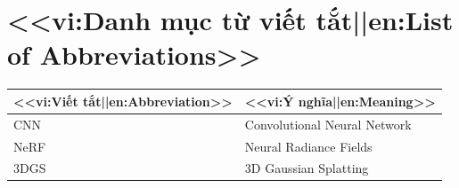 \chapter*{<<vi:Danh mục từ viết tắt||en:List of Abbreviations>>}
\begin{center}
\begin{tabular}{@{}p{3cm}p{10cm}@{}}
  \hline
  \textbf{<<vi:Viết tắt||en:Abbreviation>>} & \textbf{<<vi:Ý nghĩa||en:Meaning>>} \\ \hline
  CNN  & Convolutional Neural Network \\
  NeRF & Neural Radiance Fields \\
  3DGS & 3D Gaussian Splatting \\ \hline
\end{tabular}
\end{center}
